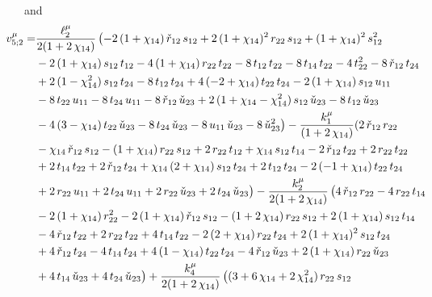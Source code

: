 \documentclass[aps,prd,preprint,groupedaddress,nofootinbib,showpacs,eqsecnum]{revtex4}
\begin{document}
and
\begin{equation}
\begin{aligned}
\hspace*{-7mm} v_{5;2}^\mu = &
\frac{\ell_2^\mu}{2(1+2\,\chi_{14})}
\,\bigl(
-2\,(1+\chi_{14})\,\rs_{12}\,s_{12}
+2\,(1+\chi_{14})^{2}\,r_{22}\,s_{12}
+(1+\chi_{14})^2\,s_{12}^{2}
\\ &
-2\,(1+\chi_{14})\,s_{12}\,t_{12}
-4\,(1+\chi_{14})\,r_{22}\,t_{22}-8\,t_{12}\,t_{22}
-8\,t_{14}\,t_{22}-4\,t_{22}^{2}-8\,\rs_{12}\,t_{24}
\\ &
+2\,(1-\chi_{14}^2)\,s_{12}\,t_{24}
-8\,t_{12}\,t_{24}+4\,(-2+\chi_{14})\,t_{22}\,t_{24}
-2\,(1+\chi_{14})\,s_{12}\,u_{11}
\\ &
-8\,t_{22}\,u_{11}
-8\,t_{24}\,u_{11}-8\,\rs_{12}\,\us_{23}
+2\,(1+\chi_{14}-\chi_{14}^{2})\,s_{12}\,\us_{23}
-8\,t_{12}\,\us_{23}
\\ &
-4\,(3-\chi_{14})\,t_{22}\,\us_{23}
-8\,t_{24}\,\us_{23}-8\,u_{11}\,\us_{23}-8\,\us_{23}^{2}\bigr)
-\frac{k_{1}^\mu}{(1+2\,\chi_{14})}
(2\,\rs_{12}\,r_{22}
\\ &
-\chi_{14}\,\rs_{12}\,s_{12}
-(1+\chi_{14})\,r_{22}\,s_{12}+2\,r_{22}\,t_{12}
+\chi_{14}\,s_{12}\,t_{14}-2\,\rs_{12}\,t_{22}
+2\,r_{22}\,t_{22}
\\ &
+2\,t_{14}\,t_{22}+2\,\rs_{12}\,t_{24}
+\chi_{14}\,(2+\chi_{14})\,s_{12}\,t_{24}
+2\,t_{12}\,t_{24}-2\,(-1+\chi_{14})\,t_{22}\,t_{24}
\\ &
+2\,r_{22}\,u_{11}+2\,t_{24}\,u_{11}+2\,r_{22}\,\us_{23}
+2\,t_{24}\,\us_{23}\bigr)
-\frac{k_{2}^\mu}{2(1+2\,\chi_{14})}\,\bigl(4\,\rs_{12}\,r_{22}
-4\,r_{22}\,t_{14}
\\ &
-2\,(1+\chi_{14})\,r_{22}^{2}
-2\,(1+\chi_{14})\,\rs_{12}\,s_{12}
-(1+2\,\chi_{14})\,r_{22}\,s_{12}
+2\,(1+\chi_{14})\,s_{12}\,t_{14}
\\ &
-4\,\rs_{12}\,t_{22}
+2\,r_{22}\,t_{22}+4\,t_{14}\,t_{22}
-2\,(2+\chi_{14})\,r_{22}\,t_{24}
+2\,(1+\chi_{14})^{2}\,s_{12}\,t_{24}
\\ &
+4\,\rs_{12}\,t_{24}
-4\,t_{14}\,t_{24}
+4\,(1-\chi_{14})\,t_{22}\,t_{24}-4\,\rs_{12}\,\us_{23}
+2\,(1+\chi_{14})\,r_{22}\,\us_{23}
\\ &
+4\,t_{14}\,\us_{23}
+4\,t_{24}\,\us_{23}\bigr)
+\frac{k_{4}^\mu}{2(1+2\,\chi_{14})}\,
\bigl((3+6\,\chi_{14}+2\,\chi_{14}^{2})\,r_{22}\,s_{12}

\end{aligned}
\end{equation}
\end{document}
